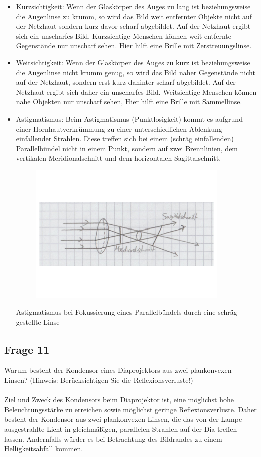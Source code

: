 \documentclass[a4paper,10pt]{scrartcl}
\begin{document}
		\begin{itemize}
			\item Kurzsichtigkeit: Wenn der Glaskörper des Auges zu lang ist beziehungsweise die Augenlinse zu krumm, so wird das Bild weit entfernter Objekte nicht auf der Netzhaut sondern kurz davor scharf abgebildet. Auf der Netzhaut ergibt sich ein unscharfes Bild. Kurzsichtige Menschen können weit entfernte Gegenstände nur unscharf sehen. Hier hilft eine Brille mit Zerstreuungslinse.
			\item Weitsichtigkeit: Wenn der Glaskörper des Auges zu kurz ist beziehungsweise die Augenlinse nicht krumm genug, so wird das Bild naher Gegenstände nicht auf der Netzhaut, sondern erst kurz dahinter scharf abgebildet. Auf der Netzhaut ergibt sich daher ein unscharfes Bild. Weitsichtige Menschen können nahe Objekten nur unscharf sehen, Hier hilft eine Brille mit Sammellinse.
			\item Astigmatismus: Beim Astigmatismus (Punktlosigkeit) kommt es aufgrund einer Hornhautverkrümmung zu einer unterschiedlichen Ablenkung einfallender Strahlen. Diese treffen sich bei einem (schräg einfallenden) Parallelbündel nicht in einem Punkt, sondern auf zwei Brennlinien, dem vertikalen Meridionalschnitt und dem horizontalen Sagittalschnitt.
			
					\begin{figure}[h]
\centering
\includegraphics[width=0.9\textwidth]{./Bilder/ogmarcostinkt}
\end{figure}
\FloatBarrier
	
				Astigmatismus bei Fokussierung eines Parallelbündels durch eine schräg gestellte Linse
		\end{itemize}
	\subsection{Frage 11}
		Warum besteht der Kondensor eines Diaprojektors aus zwei plankonvexen Linsen? (Hinweis: Berücksichtigen Sie die Reflexionsverluste!)
		\\
		\\
		Ziel und Zweck des Kondensors beim Diaprojektor ist, eine möglichst hohe Beleuchtungsstärke zu erreichen sowie möglichst geringe Reflexionsverluste. Daher besteht der Kondensor aus zwei plankonvexen Linsen, die das von der Lampe ausgestrahlte Licht in gleichmäßigen, parallelen Strahlen auf der Dia treffen lassen. Andernfalls würder es bei Betrachtung des Bildrandes zu einem Helligkeitsabfall kommen.
\end{document}
